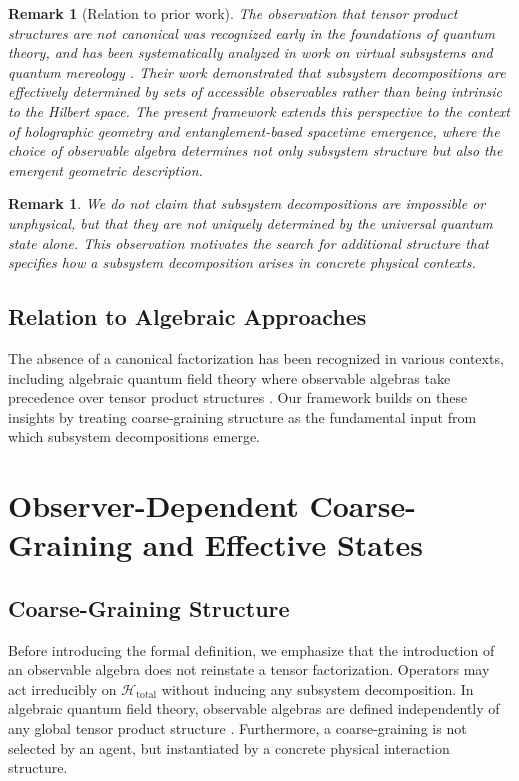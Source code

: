 \documentclass[12pt,a4paper]{article}
\newtheorem{remark}[theorem]{Remark}
\begin{document}
\begin{remark}[Relation to prior work]
The observation that tensor product structures are not canonical was recognized early in the foundations of quantum theory, and has been systematically analyzed in work on virtual subsystems and quantum mereology \cite{Zanardi2001,Zanardi2004,Cotler2019,CarrollSingh2021}.
Their work demonstrated that subsystem decompositions are effectively determined by sets of accessible observables rather than being intrinsic to the Hilbert space.
The present framework extends this perspective to the context of holographic geometry and entanglement-based spacetime emergence, where the choice of observable algebra determines not only subsystem structure but also the emergent geometric description.
\end{remark}

\begin{remark}
We do not claim that subsystem decompositions are impossible or unphysical, but that they are not uniquely determined by the universal quantum state alone. 
This observation motivates the search for additional structure that specifies how a subsystem decomposition arises in concrete physical contexts.
\end{remark}

\subsection{Relation to Algebraic Approaches}

The absence of a canonical factorization has been recognized in various contexts, including algebraic quantum field theory where observable algebras take precedence over tensor product structures \cite{Haag1996}.
Our framework builds on these insights by treating coarse-graining structure as the fundamental input from which subsystem decompositions emerge.

\section{Observer-Dependent Coarse-Graining and Effective States}
\label{sec:coarse}

\subsection{Coarse-Graining Structure}

Before introducing the formal definition, we emphasize that the introduction of an observable algebra does not reinstate a tensor factorization. 
Operators may act irreducibly on $\mathcal{H}_{\text{total}}$ without inducing any subsystem decomposition. 
In algebraic quantum field theory, observable algebras are defined independently of any global tensor product structure \cite{Haag1996}.
Furthermore, a coarse-graining is not selected by an agent, but instantiated by a concrete physical interaction structure.
\end{document}

